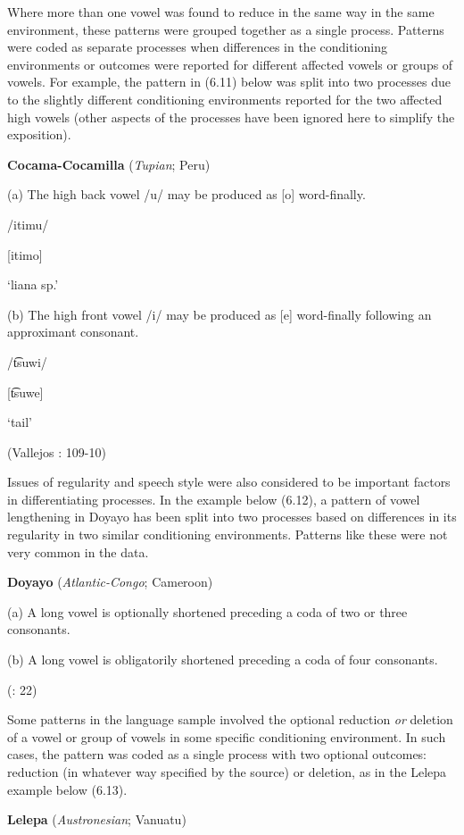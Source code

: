  Where more than one vowel was found to reduce in the same way in the same environment, these patterns were grouped together as a single process. Patterns were coded as separate processes when differences in the conditioning environments or outcomes were reported for different affected vowels or groups of vowels. For example, the pattern in (6.11) below was split into two processes due to the slightly different conditioning environments reported for the two affected high vowels (other aspects of the processes have been ignored here to simplify the exposition).

\ea\label{ex:(6.11)}
   \textbf{Cocama-Cocamilla} (\textit{Tupian}; Peru)

(a)  The high back vowel /u/ may be produced as [o] word-finally.

/itimu/

[itimo]

‘liana sp.’

(b)   The high front vowel /i/ may be produced as [e] word-finally following an approximant consonant.

/t͡suwi/

[t͡suwe]

‘tail’

(Vallejos \citealt{Yopán2010}: 109{}-10)
\z

  Issues of regularity and speech style were also considered to be important factors in differentiating processes. In the example below (6.12), a pattern of vowel lengthening in Doyayo has been split into two processes based on differences in its regularity in two similar conditioning environments. Patterns like these were not very common in the data.

\ea\label{ex:(6.12)}
   \textbf{Doyayo} (\textit{Atlantic-Congo}; Cameroon)

(a)  A long vowel is optionally shortened preceding a coda of two or three consonants.

(b)   A long vowel is obligatorily shortened preceding a coda of four consonants.

(\citealt{WieringWiering1994}: 22)
\z

  Some patterns in the language sample involved the optional reduction \textit{or} deletion of a vowel or group of vowels in some specific conditioning environment. In such cases, the pattern was coded as a single process with two optional outcomes: reduction (in whatever way specified by the source) or deletion, as in the Lelepa example below (6.13).

\ea\label{ex:(6.13)}
   \textbf{Lelepa} (\textit{Austronesian}; Vanuatu)

